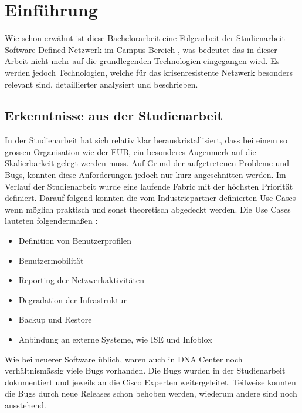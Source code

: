 \section{Einführung}

Wie schon erwähnt ist diese Bachelorarbeit eine Folgearbeit der Studienarbeit Software-Defined Netzwerk im Campus Bereich \cite{studienarbeit}, was bedeutet das in dieser Arbeit nicht mehr auf die grundlegenden Technologien eingegangen wird. Es werden jedoch Technologien, welche für das krisenresistente Netzwerk besonders relevant sind, detaillierter analysiert und beschrieben. 

\subsection{Erkenntnisse aus der Studienarbeit}

In der Studienarbeit hat sich relativ klar herauskristallisiert, dass bei einem so grossen Organisation wie der FUB, ein besonderes Augenmerk auf die Skalierbarkeit gelegt werden muss. Auf Grund der aufgetretenen Probleme und Bugs, konnten diese Anforderungen jedoch nur kurz angeschnitten werden. Im Verlauf der Studienarbeit wurde eine laufende Fabric mit der höchsten Priorität definiert. Darauf folgend konnten die vom Industriepartner definierten Use Cases wenn möglich praktisch und sonst theoretisch abgedeckt werden. Die Use Cases lauteten folgendermaßen \cite{studienarbeit}:

\begin{itemize}
	\item Definition von Benutzerprofilen
	\item Benutzermobilität
	\item Reporting der Netzwerkaktivitäten
	\item Degradation der Infrastruktur
	\item Backup und Restore
	\item Anbindung an externe Systeme, wie ISE und Infoblox
\end{itemize}


Wie bei neuerer Software üblich, waren auch in DNA Center noch verhältnismässig viele
Bugs vorhanden. Die Bugs wurden in der Studienarbeit dokumentiert und jeweils an die Cisco
Experten weitergeleitet. Teilweise konnten die Bugs durch neue Releases schon behoben werden, wiederum andere sind noch ausstehend. 


